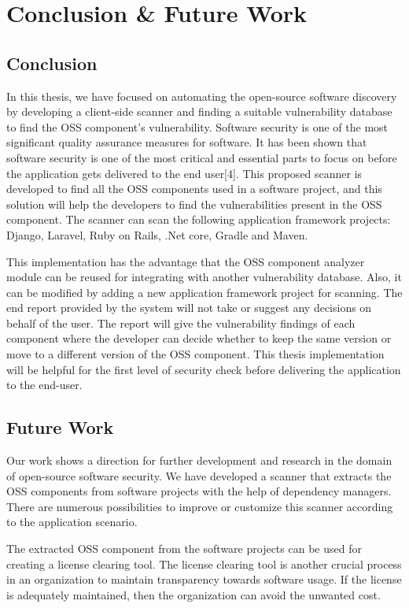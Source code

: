 %
\section{Conclusion \& Future Work}\label{sec:conclusion}

\subsection{Conclusion}
In this thesis, we have focused on automating the open-source software discovery by developing a client-side scanner and finding a suitable vulnerability database to find the \acs{OSS} component’s vulnerability. Software security is one of the most significant quality assurance measures for software. It has been shown that software security is one of the most critical and essential parts to focus on before the application gets delivered to the end user[4]. This proposed scanner is developed to find all the OSS components used in a software project, and this solution will help the developers to find the vulnerabilities present in the \acs{OSS} component. The scanner can scan the following application framework projects: Django, Laravel, Ruby on Rails, .Net core, Gradle and Maven.

This implementation has the advantage that the \acs{OSS} component analyzer module can be reused for integrating with another vulnerability database. Also, it can be modified by adding a new application framework project for scanning. The end report provided by the system will not take or suggest any decisions on behalf of the user. The report will give the vulnerability findings of each component where the developer can decide whether to keep the same version or move to a different version of the \acs{OSS} component. This thesis implementation will be helpful for the first level of security check before delivering the application to the end-user.

\subsection{Future Work}
Our work shows a direction for further development and research in the domain of open-source software security. We have developed a scanner that extracts the \acs{OSS} components from software projects with the help of dependency managers. There are numerous
possibilities to improve or customize this scanner according to the application scenario.

The extracted \acs{OSS} component from the software projects can be used for creating a license clearing tool. The license clearing tool is another crucial process in an organization to maintain transparency towards software usage. If the license is adequately maintained, then the organization can avoid the unwanted cost.

